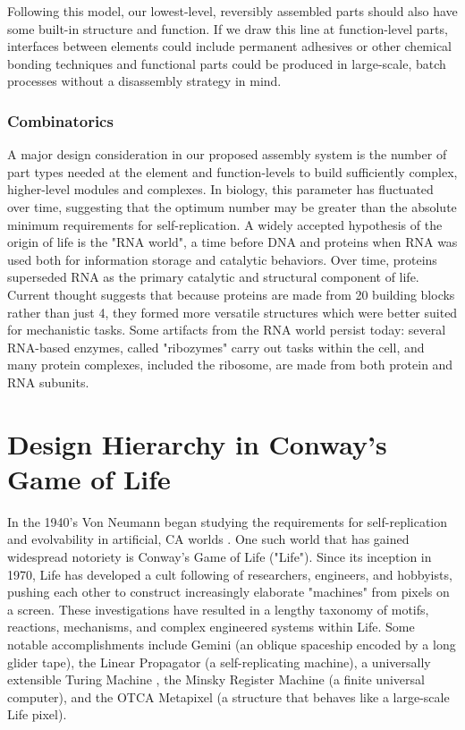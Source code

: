 {Following this model, our lowest-level, reversibly assembled parts should also have some built-in structure and function.  If we draw this line at function-level parts, interfaces between elements could include permanent adhesives or other chemical bonding techniques and functional parts could be produced in large-scale, batch processes without a disassembly strategy in mind.

\subsubsection{Combinatorics}

%
A major design consideration in our proposed assembly system is the number of part types needed at the element and function-levels to build sufficiently complex, higher-level modules and complexes.  In biology, this parameter has fluctuated over time, suggesting that the optimum number may be greater than the absolute minimum requirements for self-replication.  A widely accepted hypothesis of the origin of life is the "RNA world", a time before DNA and proteins when RNA was used both for information storage and catalytic behaviors.  Over time, proteins superseded RNA as the primary catalytic and structural component of life.  Current thought suggests that because proteins are made from 20 building blocks rather than just 4, they formed more versatile structures which were better suited for mechanistic tasks\cite{Alberts2002}.  Some artifacts from the RNA world persist today: several RNA-based enzymes, called "ribozymes" carry out tasks within the cell, and many protein complexes, included the ribosome, are made from both protein and RNA subunits.

\section{Design Hierarchy in Conway's Game of Life}\label{sec:conwayHierarchy}

In the 1940's Von Neumann began studying the requirements for self-replication and evolvability in artificial, CA worlds \cite{Neumann1966}.  One such world that has gained widespread notoriety is Conway's Game of Life ("Life").  Since its inception in 1970, Life has developed a cult following of researchers, engineers, and hobbyists, pushing each other to construct increasingly elaborate "machines" from pixels on a screen.  These investigations have resulted in a lengthy taxonomy of motifs, reactions, mechanisms, and complex engineered systems within Life.  Some notable accomplishments include Gemini (an oblique spaceship encoded by a long glider tape)\cite{Wade2010}, the Linear Propagator (a self-replicating machine)\cite{Greene2013}, a universally extensible Turing Machine \cite{Rendell2000}, the Minsky Register Machine (a finite universal computer)\cite{Chapman2002}, and the OTCA Metapixel (a structure that behaves like a large-scale Life pixel)\cite{Due2006}.\\

}
